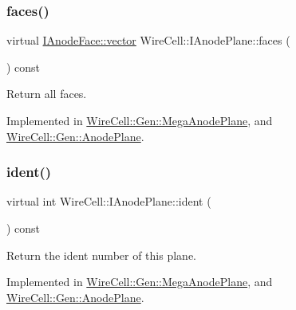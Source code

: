 \subsubsection{\texorpdfstring{faces()}{faces()}}
{\footnotesize\ttfamily virtual \hyperlink{class_wire_cell_1_1_i_component_a18978d88ce697af5941655a89660fd4e}{I\+Anode\+Face\+::vector} Wire\+Cell\+::\+I\+Anode\+Plane\+::faces (\begin{DoxyParamCaption}{ }\end{DoxyParamCaption}) const\hspace{0.3cm}{\ttfamily [pure virtual]}}



Return all faces. 



Implemented in \hyperlink{class_wire_cell_1_1_gen_1_1_mega_anode_plane_a8f1eacc7a7ec70f52befcaa2c9321591}{Wire\+Cell\+::\+Gen\+::\+Mega\+Anode\+Plane}, and \hyperlink{class_wire_cell_1_1_gen_1_1_anode_plane_ad25ce7beb274de6570cbb104a1a67702}{Wire\+Cell\+::\+Gen\+::\+Anode\+Plane}.

\mbox{\label{class_wire_cell_1_1_i_anode_plane_a18dfeccffc41a8fca3631a4e98967c57}} 
\subsubsection{\texorpdfstring{ident()}{ident()}}
{\footnotesize\ttfamily virtual int Wire\+Cell\+::\+I\+Anode\+Plane\+::ident (\begin{DoxyParamCaption}{ }\end{DoxyParamCaption}) const\hspace{0.3cm}{\ttfamily [pure virtual]}}



Return the ident number of this plane. 



Implemented in \hyperlink{class_wire_cell_1_1_gen_1_1_mega_anode_plane_a4f464401cebc46073d4fef4cafe67d97}{Wire\+Cell\+::\+Gen\+::\+Mega\+Anode\+Plane}, and \hyperlink{class_wire_cell_1_1_gen_1_1_anode_plane_afe12d9d6f826b42e66d9ab9da7799dae}{Wire\+Cell\+::\+Gen\+::\+Anode\+Plane}.

\mbox{\label{class_wire_cell_1_1_i_anode_plane_ace24697d669e5b25613db8ad110611f0}} 
